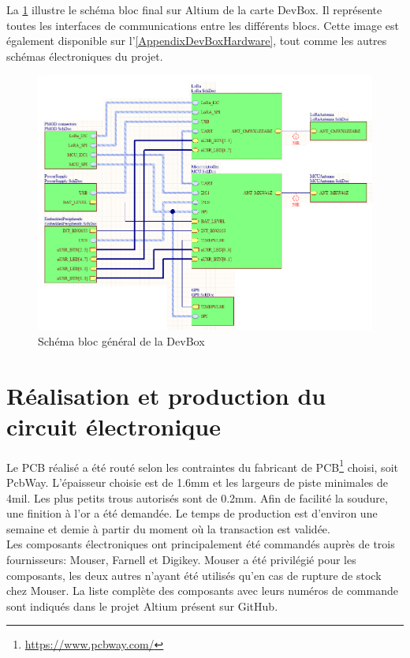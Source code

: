 La \cref{fig-hardware_bloc_diagram} illustre le schéma bloc final sur Altium de la carte DevBox. Il représente toutes les interfaces de communications entre les différents blocs. Cette image est également disponible sur l'\cref{AppendixDevBoxHardware}, tout comme les autres schémas électroniques du projet.\\


\begin{figure}[ht!]
    \centering
    \includegraphics[width=1.05\textwidth]{Figures/Hardware/hardware_bloc_diagram.png}
    \caption{Schéma bloc général de la DevBox}
    \label{fig-hardware_bloc_diagram}
\end{figure}


\FloatBarrier
\section{Réalisation et production du circuit électronique}

Le PCB réalisé a été routé selon les contraintes du fabricant de PCB\footnote{\url{https://www.pcbway.com/}} choisi, soit PcbWay. L'épaisseur choisie est de 1.6mm et les largeurs de piste minimales de 4mil. Les plus petits trous autorisés sont de 0.2mm. Afin de facilité la soudure, une finition à l'or a été demandée. Le temps de production est d'environ une semaine et demie à partir du moment où la transaction est validée. \\

Les composants électroniques ont principalement été commandés auprès de trois fournisseurs: Mouser, Farnell et Digikey. Mouser a été privilégié pour les composants, les deux autres n'ayant été utilisés qu'en cas de rupture de stock chez Mouser. La liste complète des composants avec leurs numéros de commande sont indiqués dans le projet Altium présent sur GitHub.\\

